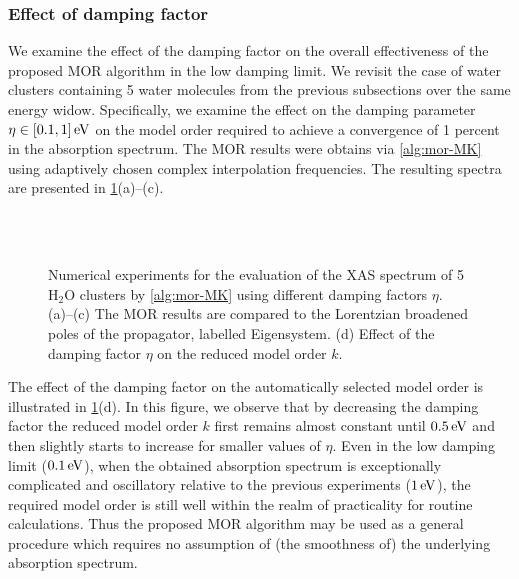 \subsubsection{Effect of damping factor}
\label{sec:MORbroad}

We examine the effect of the damping factor on the overall effectiveness of the proposed MOR algorithm in the low damping limit. We revisit the case of water clusters containing 5 water molecules from the previous subsections over the same energy widow. Specifically, we examine the effect on the damping parameter $\eta\in[0.1,1]\,\mathrm{eV}$ on the model order required to achieve a convergence of 1 percent in the absorption spectrum. The MOR results were obtains via \cref{alg:mor-MK} using adaptively chosen complex interpolation frequencies. The resulting spectra are presented in \cref{fig:damping}(a)--(c).

\begin{figure}[hbtp]
\centering
{}%
%
\\[10pt]
%
%
\\[10pt]
\caption{Numerical experiments for the evaluation of the XAS spectrum of 5 H$_2$O clusters by \cref{alg:mor-MK} using different damping factors $\eta$. (a)--(c) The MOR results are compared to the Lorentzian broadened poles of the propagator, labelled Eigensystem. (d) Effect of the damping factor $\eta$ on the reduced model order $k$.}
\label{fig:damping}
\end{figure}

The effect of the damping factor on the automatically selected model order is illustrated in \cref{fig:damping}(d). In this figure, we observe that by decreasing the damping factor the reduced model order $k$ first remains almost constant until $0.5\,\mathrm{eV}$ and then slightly starts to increase for smaller values of $\eta$. Even in the low damping limit ($0.1\,\mathrm{eV}$), when the obtained absorption spectrum is exceptionally complicated and oscillatory relative to the previous experiments ($1\,\mathrm{eV}$), the required model order is still well within the realm of practicality for routine calculations. Thus the proposed MOR algorithm may be used as a general procedure which requires no assumption of (the smoothness of) the underlying absorption spectrum.

